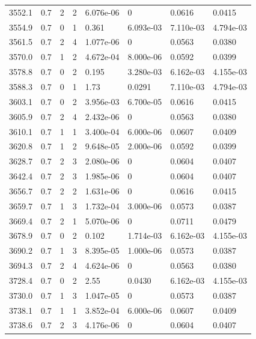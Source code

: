 \documentclass[preview]{standalone}
\begin{document}
{{{{{{{{{{\begin{tabular}{L{1.2cm}C{1.2cm} C{0.3cm}C{0.5cm} C{1.4cm}C{1.4cm} C{1.4cm}C{1.4cm}}
  3552.1  &   0.7  & 2     &  2 &  6.076e-06  & 0  & 0.0616 &  0.0415   \\ 
  3554.9  &   0.7  & 0     &  1 &  0.361  & 6.093e-03  & 7.110e-03 &  4.794e-03   \\ 
  3561.5  &   0.7  & 2     &  4 &  1.077e-06  & 0  & 0.0563 &  0.0380   \\ 
  3570.0  &   0.7  & 1     &  2 &  4.672e-04  & 8.000e-06  & 0.0592 &  0.0399   \\ 
  3578.8  &   0.7  & 0     &  2 &  0.195  & 3.280e-03  & 6.162e-03 &  4.155e-03   \\ 
  3588.3  &   0.7  & 0     &  1 &  1.73  & 0.0291  & 7.110e-03 &  4.794e-03   \\ 
  3603.1  &   0.7  & 0     &  2 &  3.956e-03  & 6.700e-05  & 0.0616 &  0.0415   \\ 
  3605.9  &   0.7  & 2     &  4 &  2.432e-06  & 0  & 0.0563 &  0.0380   \\ 
  3610.1  &   0.7  & 1     &  1 &  3.400e-04  & 6.000e-06  & 0.0607 &  0.0409   \\ 
  3620.8  &   0.7  & 1     &  2 &  9.648e-05  & 2.000e-06  & 0.0592 &  0.0399   \\ 
  3628.7  &   0.7  & 2     &  3 &  2.080e-06  & 0  & 0.0604 &  0.0407   \\ 
  3642.4  &   0.7  & 2     &  3 &  1.985e-06  & 0  & 0.0604 &  0.0407   \\ 
  3656.7  &   0.7  & 2     &  2 &  1.631e-06  & 0  & 0.0616 &  0.0415   \\ 
  3659.7  &   0.7  & 1     &  3 &  1.732e-04  & 3.000e-06  & 0.0573 &  0.0387   \\ 
  3669.4  &   0.7  & 2     &  1 &  5.070e-06  & 0  & 0.0711 &  0.0479   \\ 
  3678.9  &   0.7  & 0     &  2 &  0.102  & 1.714e-03  & 6.162e-03 &  4.155e-03   \\ 
  3690.2  &   0.7  & 1     &  3 &  8.395e-05  & 1.000e-06  & 0.0573 &  0.0387   \\ 
  3694.3  &   0.7  & 2     &  4 &  4.624e-06  & 0  & 0.0563 &  0.0380   \\ 
  3728.4  &   0.7  & 0     &  2 &  2.55  & 0.0430  & 6.162e-03 &  4.155e-03   \\ 
  3730.0  &   0.7  & 1     &  3 &  1.047e-05  & 0  & 0.0573 &  0.0387   \\ 
  3738.1  &   0.7  & 1     &  1 &  3.852e-04  & 6.000e-06  & 0.0607 &  0.0409   \\ 
  3738.6  &   0.7  & 2     &  3 &  4.176e-06  & 0  & 0.0604 &  0.0407   \\ 

\end{tabular}}}}}}}}}}}
\end{document}
